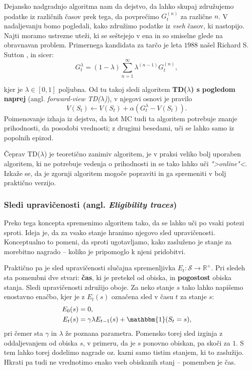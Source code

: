 \documentclass[12pt,a4paper]{amsart}
\theoremstyle{definition} %
\theoremstyle{plain} %
\begin{document}
Dejansko nadgradnjo algoritma nam da dejstvo, da lahko skupaj združujemo podatke iz različnih časov 
prek tega, da povprečimo $G_t^{(n)}$ za različne $n$. V nadaljevanju bomo pogledali, kako združimo 
podatke iz \textit{vseh} časov, ki nastopijo. Najti moramo ustrezne uteži, ki se seštejejo v ena in so 
smiselne glede na obravnavan problem. Primernega kandidata za tarčo je leta $1988$ našel Richard S. 
Sutton \cite{TDlambda}, in sicer:
$$
G_t^\lambda = (1 - \lambda) \sum_{n=1}^\infty \lambda^{(n-1)} G_t^{(n)},
$$

kjer je $\lambda \in [0, 1]$ poljubna. Od tu takoj sledi algoritem \textbf{TD($\lambda$) s pogledom 
naprej} (angl. \textit{forward-view TD($\lambda$)}), v njegovi osnovi je pravilo 
$$
V(S_t) \leftarrow V(S_t) + \alpha (G_t^\lambda - V(S_t)).
$$ 
Poimenovanje izhaja iz dejstva, da kot MC tudi ta algoritem potrebuje znanje prihodnosti, da posodobi 
vrednosti; z drugimi besedami, uči se lahko samo iz popolnih epizod.

Čeprav TD($\lambda$) je teoretično zanimiv algoritem, je v praksi veliko bolj uporaben algoritem, 
ki ne potrebuje vedenja o prihodnosti in se tako lahko uči \textit{">online"<}. Izkaže se, da je 
zgornji algoritem mogoče popraviti in ga spremeniti v bolj praktično verzijo.

\subsubsection{Sledi upravičenosti (angl. \textit{Eligibility traces})}
Preko tega koncepta spremenimo algoritem tako, da se lahko uči po vsaki potezi sproti. Ideja 
je, da za vsako stanje hranimo njegovo sled upravičenosti. Konceptualno to pomeni, da sproti 
ugotavljamo, kako zasluženo je stanje za morebitno nagrado -- koliko je pripomoglo k njeni 
pridobitvi.

Praktično pa je sled upravičenosti slučajna spremenljivka $E_t: \mathcal{S} \rightarrow \mathbb{R}^+$. 
Pri sledeh sta pomembni dve stvari: \textbf{čas}, ki je pretekel od obiska, in \textbf{pogostost} 
obiska stanja. Sledi upravičenosti združijo oboje. Za neko stanje $s$ tako lahko napišemo enostavno 
enačbo, kjer je z $E_t(s)$ označena sled v času $t$ za stanje $s$:
\begin{align*}
    E_0(s) &= 0, \\
    E_t(s) &= \gamma \lambda E_{t-1}(s) + \mathbbm{1}(S_t = s),
\end{align*}
pri čemer sta $\gamma$ in $\lambda$ že poznana parametra. Pomensko torej sled izginja z oddaljevanjem 
od obiska $s$, v primeru, da je $s$ ponovno obiskan, pa skoči za $1$. S tem lahko torej dodelimo 
nagrade oz. kazni samo tistim stanjem, ki to zaslužijo. Hkrati pa tudi ne vrednotimo enako vseh 
obiskanih stanj -- pomemben je čas.
\end{document}
